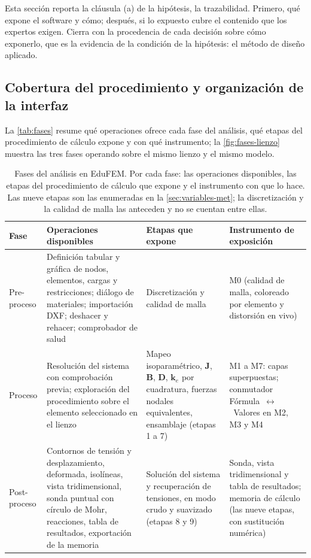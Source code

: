 Esta sección reporta la cláusula (a) de la hipótesis, la trazabilidad. Primero, qué expone el software y cómo; después, si lo expuesto cubre el contenido que los expertos exigen. Cierra con la procedencia de cada decisión sobre cómo exponerlo, que es la evidencia de la condición de la hipótesis: el método de diseño aplicado.

\subsection{Cobertura del procedimiento y organización de la interfaz}
\label{sec:cobertura-canal}

La \autoref{tab:fases} resume qué operaciones ofrece cada fase del análisis, qué etapas del procedimiento de cálculo expone y con qué instrumento; la \autoref{fig:fases-lienzo} muestra las tres fases operando sobre el mismo lienzo y el mismo modelo.

\begin{table}[!htbp]
\centering
\caption[Fases del análisis en EduFEM: operaciones y exposición del procedimiento.]{Fases del análisis en EduFEM. Por cada fase: las operaciones disponibles, las etapas del procedimiento de cálculo que expone y el instrumento con que lo hace. Las nueve etapas son las enumeradas en la \autoref{sec:variables-met}; la discretización y la calidad de malla las anteceden y no se cuentan entre ellas.}
\label{tab:fases}
{\footnotesize
\setlength{\tabcolsep}{4pt}
\begin{tabular}{@{}>{\raggedright\arraybackslash}p{1.9cm}>{\raggedright\arraybackslash}p{5.1cm}>{\raggedright\arraybackslash}p{3.3cm}>{\raggedright\arraybackslash}p{3.7cm}@{}}
\toprule
\textbf{Fase} & \textbf{Operaciones disponibles} & \textbf{Etapas que expone} & \textbf{Instrumento de exposición} \\
\midrule
Pre-proceso & Definición tabular y gráfica de nodos, elementos, cargas y restricciones; diálogo de materiales; importación DXF; deshacer y rehacer; comprobador de salud & Discretización y calidad de malla & M0 (calidad de malla, coloreado por elemento y distorsión en vivo) \\
Proceso & Resolución del sistema con comprobación previa; exploración del procedimiento sobre el elemento seleccionado en el lienzo & Mapeo isoparamétrico, $\bm{J}$, $\bm{B}$, $\bm{D}$, $\bm{k}_e$ por cuadratura, fuerzas nodales equivalentes, ensamblaje (etapas 1 a 7) & M1 a M7: capas superpuestas; conmutador Fórmula~$\leftrightarrow$~Valores en M2, M3 y M4 \\
Post-proceso & Contornos de tensión y desplazamiento, deformada, isolíneas, vista tridimensional, sonda puntual con círculo de Mohr, reacciones, tabla de resultados, exportación de la memoria & Solución del sistema y recuperación de tensiones, en modo crudo y suavizado (etapas 8 y 9) & Sonda, vista tridimensional y tabla de resultados; memoria de cálculo (las nueve etapas, con sustitución numérica) \\
\bottomrule
\end{tabular}}
\end{table}

